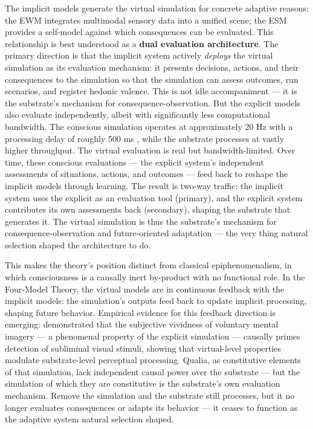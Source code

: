 \documentclass[12pt]{article}
\newcommand{\revstart}{}
\newcommand{\revend}{}
\begin{document}
The implicit models generate the virtual simulation for concrete adaptive reasons: the EWM integrates multimodal sensory data into a unified scene; the ESM provides a self-model against which consequences can be evaluated. This relationship is best understood as a \textbf{dual evaluation architecture}. The primary direction is that the implicit system actively \emph{deploys} the virtual simulation as its evaluation mechanism: it presents decisions, actions, and their consequences to the simulation so that the simulation can assess outcomes, run scenarios, and register hedonic valence. This is not idle accompaniment --- it is the substrate's mechanism for consequence-observation. But the explicit models also evaluate independently, albeit with significantly less computational bandwidth. The conscious simulation operates at approximately 20 Hz with a processing delay of roughly 500 ms \citep{VanRullen2003}, while the substrate processes at vastly higher throughput. The virtual evaluation is real but bandwidth-limited. Over time, these conscious evaluations --- the explicit system's independent assessments of situations, actions, and outcomes --- feed back to reshape the implicit models through learning. The result is two-way traffic: the implicit system uses the explicit as an evaluation tool (primary), and the explicit system contributes its own assessments back (secondary), shaping the substrate that generates it. The virtual simulation is thus the substrate's mechanism for consequence-observation and future-oriented adaptation --- the very thing natural selection shaped the architecture to do.

This makes the theory's position distinct from classical epiphenomenalism, in which consciousness is a causally inert by-product with no functional role. In the Four-Model Theory, the virtual models are in continuous feedback with the implicit models: the simulation's outputs feed back to update implicit processing, shaping future behavior. Empirical evidence for this feedback direction is emerging: \citet{Byczynski2025} demonstrated that the subjective vividness of voluntary mental imagery --- a phenomenal property of the explicit simulation --- causally primes detection of subliminal visual stimuli, showing that virtual-level properties modulate substrate-level perceptual processing. Qualia, as constitutive elements of that simulation, lack independent causal power over the substrate --- {\revstart but the simulation of which they are constitutive is the substrate's own evaluation mechanism. Remove the simulation and the substrate still processes, but it no longer evaluates consequences or adapts its behavior --- it ceases to function as the adaptive system natural selection shaped.\revend}
\end{document}
